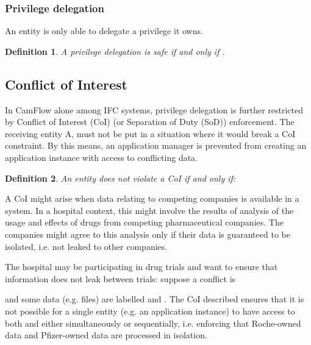 \documentclass[10pt,journal,compsoc]{IEEEtran}
\newtheorem{definition}{Definition}
\begin{document}
\subsubsection{Privilege delegation} 
\label{sec:model:delegation}

An entity is only able to delegate a privilege it owns. 

\begin{definition}
\label{def:privilege_deleg}
A privilege delegation is safe if and only if .
\end{definition}

\subsection{Conflict of Interest}
\label{sec:model:coi}

In CamFlow alone among IFC systems, privilege delegation is further restricted by Conflict of Interest (CoI) (or Separation of Duty (SoD)) enforcement. The receiving entity A, must not be put in a situation where it would break a CoI constraint. By this means, an application manager is prevented from creating an application instance with access to conflicting data.

\begin{definition}
\label{def:coi}
An entity  does not violate a CoI  if and only if:
\small

\normalsize
\end{definition}


A CoI might arise when data relating to competing companies is available in a system. In a hospital context, this might involve the results of analysis of the usage and effects of drugs from competing pharmaceutical companies. The companies might agree to this analysis only if their data is guaranteed to be isolated, i.e. not leaked to other companies. 

The hospital may be participating in drug trials and want to ensure that information does not leak between trials: 
suppose a conflict is 
 
and some data (e.g. files) are labelled  and . 
The CoI described ensures that it is not possible for a single entity (e.g. an application instance) to have access to both  and  either simultaneously or sequentially, i.e. enforcing that Roche-owned data and Pfizer-owned data are processed in isolation.
\end{document}
